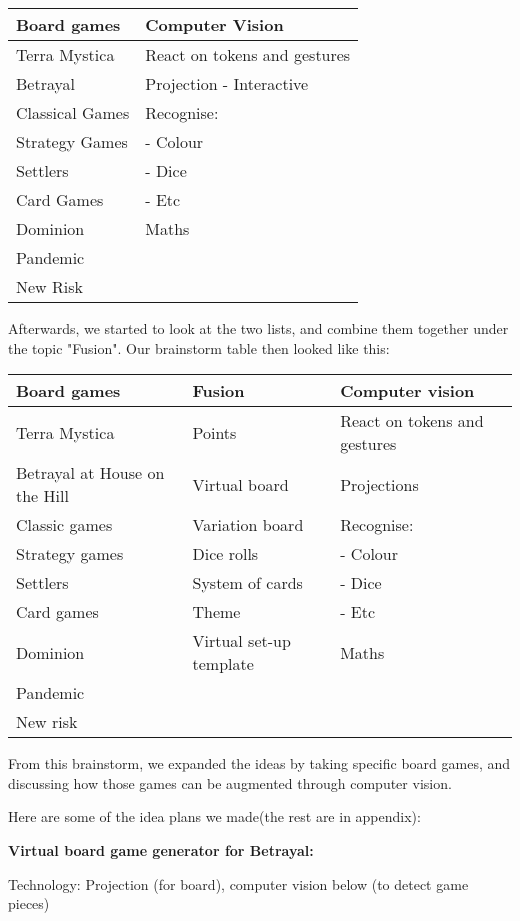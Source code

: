 \begin{tabular}{l | l}
Board games & Computer Vision\\
\hline
Terra Mystica & React on tokens and gestures\\
Betrayal & Projection - Interactive\\
Classical Games & Recognise:\\
Strategy Games & - Colour\\
Settlers & - Dice\\
Card Games & - Etc\\
Dominion & Maths\\
Pandemic & \\
New Risk & \\
\end{tabular}

Afterwards, we started to look at the two lists, and combine them together under the topic "Fusion". Our brainstorm table then looked like this:

\begin{tabular}{l | l | l}
Board games & Fusion & Computer vision\\
\hline
Terra Mystica & Points & React on tokens and gestures\\
Betrayal at House on the Hill &  Virtual board & Projections\\
Classic games & Variation board & Recognise: \\
Strategy games & Dice rolls & - Colour\\
Settlers & System of cards & - Dice\\
Card games & Theme & - Etc\\
Dominion & Virtual set-up template & Maths\\
Pandemic \\
New risk\\
\end{tabular}

From this brainstorm, we expanded the ideas by taking specific board games, and discussing how those games can be augmented through computer vision.


Here are some of the idea plans we made(the rest are in appendix):

\textbf{Virtual board game generator for Betrayal:} 

Technology: Projection (for board), computer vision below (to detect game pieces)

